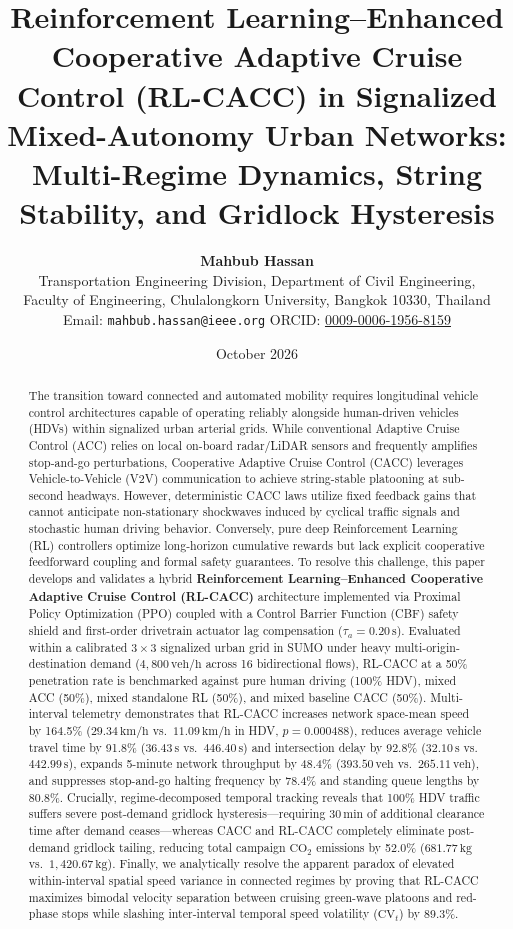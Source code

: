 \documentclass[11pt,a4paper]{article}
\title{\textbf{\Large Reinforcement Learning--Enhanced Cooperative Adaptive Cruise Control (RL-CACC) in Signalized Mixed-Autonomy Urban Networks: Multi-Regime Dynamics, String Stability, and Gridlock Hysteresis}}
\author{
    \textbf{Mahbub Hassan}\\
    \small Transportation Engineering Division, Department of Civil Engineering,\\
    \small Faculty of Engineering, Chulalongkorn University, Bangkok 10330, Thailand\\
    \small Email: \texttt{mahbub.hassan@ieee.org} \quad ORCID: \href{https://orcid.org/0009-0006-1956-8159}{0009-0006-1956-8159}
}
\date{October 2026}
\begin{document}
\maketitle

\begin{abstract}
The transition toward connected and automated mobility requires longitudinal vehicle control architectures capable of operating reliably alongside human-driven vehicles (HDVs) within signalized urban arterial grids. While conventional Adaptive Cruise Control (ACC) relies on local on-board radar/LiDAR sensors and frequently amplifies stop-and-go perturbations, Cooperative Adaptive Cruise Control (CACC) leverages Vehicle-to-Vehicle (V2V) communication to achieve string-stable platooning at sub-second headways. However, deterministic CACC laws utilize fixed feedback gains that cannot anticipate non-stationary shockwaves induced by cyclical traffic signals and stochastic human driving behavior. Conversely, pure deep Reinforcement Learning (RL) controllers optimize long-horizon cumulative rewards but lack explicit cooperative feedforward coupling and formal safety guarantees. To resolve this challenge, this paper develops and validates a hybrid \textbf{Reinforcement Learning--Enhanced Cooperative Adaptive Cruise Control (RL-CACC)} architecture implemented via Proximal Policy Optimization (PPO) coupled with a Control Barrier Function (CBF) safety shield and first-order drivetrain actuator lag compensation ($\tau_a = 0.20\,\mathrm{s}$). Evaluated within a calibrated $3\times3$ signalized urban grid in SUMO under heavy multi-origin-destination demand ($4{,}800\,\text{veh/h}$ across 16 bidirectional flows), RL-CACC at a 50\% penetration rate is benchmarked against pure human driving (100\% HDV), mixed ACC (50\%), mixed standalone RL (50\%), and mixed baseline CACC (50\%). Multi-interval telemetry demonstrates that RL-CACC increases network space-mean speed by 164.5\% ($29.34\,\text{km/h}$ vs.\ $11.09\,\text{km/h}$ in HDV, $p = 0.000488$), reduces average vehicle travel time by 91.8\% ($36.43\,\text{s}$ vs.\ $446.40\,\text{s}$) and intersection delay by 92.8\% ($32.10\,\text{s}$ vs.\ $442.99\,\text{s}$), expands 5-minute network throughput by 48.4\% ($393.50\,\text{veh}$ vs.\ $265.11\,\text{veh}$), and suppresses stop-and-go halting frequency by 78.4\% and standing queue lengths by 80.8\%. Crucially, regime-decomposed temporal tracking reveals that 100\% HDV traffic suffers severe post-demand gridlock hysteresis---requiring $30\,\text{min}$ of additional clearance time after demand ceases---whereas CACC and RL-CACC completely eliminate post-demand gridlock tailing, reducing total campaign $\text{CO}_2$ emissions by 52.0\% ($681.77\,\text{kg}$ vs.\ $1{,}420.67\,\text{kg}$). Finally, we analytically resolve the apparent paradox of elevated within-interval spatial speed variance in connected regimes by proving that RL-CACC maximizes bimodal velocity separation between cruising green-wave platoons and red-phase stops while slashing inter-interval temporal speed volatility ($\text{CV}_t$) by 89.3\%.
\end{abstract}
\end{document}
